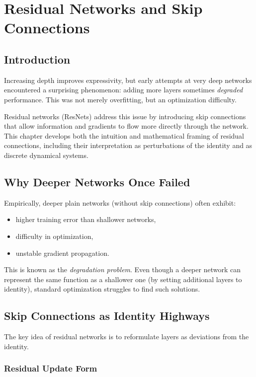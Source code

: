 \chapter{Residual Networks and Skip Connections}

\section{Introduction}

Increasing depth improves expressivity, but early attempts at very deep networks encountered a surprising phenomenon: adding more layers sometimes \emph{degraded} performance. This was not merely overfitting, but an optimization difficulty.

Residual networks (ResNets) address this issue by introducing skip connections that allow information and gradients to flow more directly through the network. This chapter develops both the intuition and mathematical framing of residual connections, including their interpretation as perturbations of the identity and as discrete dynamical systems.

\section{Why Deeper Networks Once Failed}

Empirically, deeper plain networks (without skip connections) often exhibit:
\begin{itemize}
    \item higher training error than shallower networks,
    \item difficulty in optimization,
    \item unstable gradient propagation.
\end{itemize}

This is known as the \emph{degradation problem}. Even though a deeper network can represent the same function as a shallower one (by setting additional layers to identity), standard optimization struggles to find such solutions.

\section{Skip Connections as Identity Highways}

The key idea of residual networks is to reformulate layers as deviations from the identity.

\subsection{Residual Update Form}

